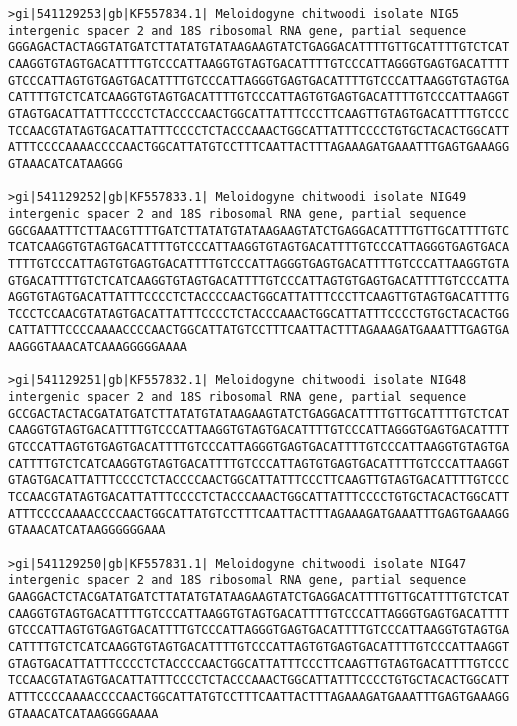 \documentclass[11pt]{article}
\begin{document}
\begin{Verbatim}[commandchars=\\\{\}]
>gi|541129253|gb|KF557834.1| Meloidogyne chitwoodi isolate NIG5 intergenic spacer 2 and 18S ribosomal RNA gene, partial sequence
GGGAGACTACTAGGTATGATCTTATATGTATAAGAAGTATCTGAGGACATTTTGTTGCATTTTGTCTCAT
CAAGGTGTAGTGACATTTTGTCCCATTAAGGTGTAGTGACATTTTGTCCCATTAGGGTGAGTGACATTTT
GTCCCATTAGTGTGAGTGACATTTTGTCCCATTAGGGTGAGTGACATTTTGTCCCATTAAGGTGTAGTGA
CATTTTGTCTCATCAAGGTGTAGTGACATTTTGTCCCATTAGTGTGAGTGACATTTTGTCCCATTAAGGT
GTAGTGACATTATTTCCCCTCTACCCCAACTGGCATTATTTCCCTTCAAGTTGTAGTGACATTTTGTCCC
TCCAACGTATAGTGACATTATTTCCCCTCTACCCAAACTGGCATTATTTCCCCTGTGCTACACTGGCATT
ATTTCCCCAAAACCCCAACTGGCATTATGTCCTTTCAATTACTTTAGAAAGATGAAATTTGAGTGAAAGG
GTAAACATCATAAGGG

>gi|541129252|gb|KF557833.1| Meloidogyne chitwoodi isolate NIG49 intergenic spacer 2 and 18S ribosomal RNA gene, partial sequence
GGCGAAATTTCTTAACGTTTTGATCTTATATGTATAAGAAGTATCTGAGGACATTTTGTTGCATTTTGTC
TCATCAAGGTGTAGTGACATTTTGTCCCATTAAGGTGTAGTGACATTTTGTCCCATTAGGGTGAGTGACA
TTTTGTCCCATTAGTGTGAGTGACATTTTGTCCCATTAGGGTGAGTGACATTTTGTCCCATTAAGGTGTA
GTGACATTTTGTCTCATCAAGGTGTAGTGACATTTTGTCCCATTAGTGTGAGTGACATTTTGTCCCATTA
AGGTGTAGTGACATTATTTCCCCTCTACCCCAACTGGCATTATTTCCCTTCAAGTTGTAGTGACATTTTG
TCCCTCCAACGTATAGTGACATTATTTCCCCTCTACCCAAACTGGCATTATTTCCCCTGTGCTACACTGG
CATTATTTCCCCAAAACCCCAACTGGCATTATGTCCTTTCAATTACTTTAGAAAGATGAAATTTGAGTGA
AAGGGTAAACATCAAAGGGGGAAAA

>gi|541129251|gb|KF557832.1| Meloidogyne chitwoodi isolate NIG48 intergenic spacer 2 and 18S ribosomal RNA gene, partial sequence
GCCGACTACTACGATATGATCTTATATGTATAAGAAGTATCTGAGGACATTTTGTTGCATTTTGTCTCAT
CAAGGTGTAGTGACATTTTGTCCCATTAAGGTGTAGTGACATTTTGTCCCATTAGGGTGAGTGACATTTT
GTCCCATTAGTGTGAGTGACATTTTGTCCCATTAGGGTGAGTGACATTTTGTCCCATTAAGGTGTAGTGA
CATTTTGTCTCATCAAGGTGTAGTGACATTTTGTCCCATTAGTGTGAGTGACATTTTGTCCCATTAAGGT
GTAGTGACATTATTTCCCCTCTACCCCAACTGGCATTATTTCCCTTCAAGTTGTAGTGACATTTTGTCCC
TCCAACGTATAGTGACATTATTTCCCCTCTACCCAAACTGGCATTATTTCCCCTGTGCTACACTGGCATT
ATTTCCCCAAAACCCCAACTGGCATTATGTCCTTTCAATTACTTTAGAAAGATGAAATTTGAGTGAAAGG
GTAAACATCATAAGGGGGGAAA

>gi|541129250|gb|KF557831.1| Meloidogyne chitwoodi isolate NIG47 intergenic spacer 2 and 18S ribosomal RNA gene, partial sequence
GAAGGACTCTACGATATGATCTTATATGTATAAGAAGTATCTGAGGACATTTTGTTGCATTTTGTCTCAT
CAAGGTGTAGTGACATTTTGTCCCATTAAGGTGTAGTGACATTTTGTCCCATTAGGGTGAGTGACATTTT
GTCCCATTAGTGTGAGTGACATTTTGTCCCATTAGGGTGAGTGACATTTTGTCCCATTAAGGTGTAGTGA
CATTTTGTCTCATCAAGGTGTAGTGACATTTTGTCCCATTAGTGTGAGTGACATTTTGTCCCATTAAGGT
GTAGTGACATTATTTCCCCTCTACCCCAACTGGCATTATTTCCCTTCAAGTTGTAGTGACATTTTGTCCC
TCCAACGTATAGTGACATTATTTCCCCTCTACCCAAACTGGCATTATTTCCCCTGTGCTACACTGGCATT
ATTTCCCCAAAACCCCAACTGGCATTATGTCCTTTCAATTACTTTAGAAAGATGAAATTTGAGTGAAAGG
GTAAACATCATAAGGGGAAAA


\end{Verbatim}
\end{document}
